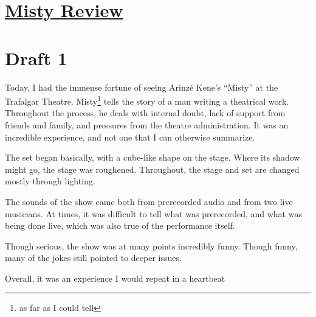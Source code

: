 \documentclass[12pt]{article}[titlepage]
\newcommand{\say}[1]{``#1''}
\newcommand{\1}{\={a}}
\newcommand{\2}{\={e}}
\newcommand{\3}{\={\i}}
\newcommand{\4}{\=o}
\newcommand{\5}{\=u}
\newcommand{\6}{\={A}}
\renewcommand{\,}{\textsuperscript{,}}
\begin{document}
\doublespacing
\section{\href{misty.html}{Misty Review}}
\section{Draft 1}
Today, I had the immense fortune of seeing Arinz\'e Kene's \say{Misty} at the Trafalgar Theatre.
Misty\footnote{as far as I could tell} tells the story of a man writing a theatrical work.
Throughout the process, he deals with internal doubt, lack of support from friends and family, and pressures from the theatre administration.
It was an incredible experience, and not one that I can otherwise summarize.

The set began basically, with a cube-like shape on the stage.
Where its shadow might go, the stage was roughened.
Throughout, the stage and set are changed mostly through lighting.

The sounds of the show came both from prerecorded audio and from two live musicians.
At times, it was difficult to tell what was prerecorded, and what was being done live, which was also true of the performance itself.

Though serious, the show was at many points incredibly funny.
Though funny, many of the jokes still pointed to deeper issues.

Overall, it was an experience I would repeat in a heartbeat
\end{document}
